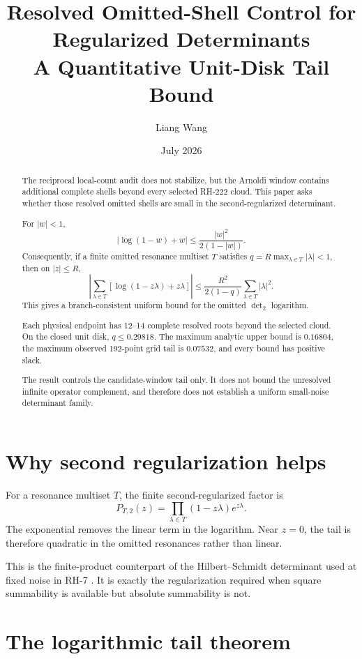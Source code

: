 \documentclass[11pt]{article}
\title{Resolved Omitted-Shell Control for Regularized Determinants\\
\large A Quantitative Unit-Disk Tail Bound}
\author{Liang Wang}
\date{July 2026}
\theoremstyle{remark}\newtheorem{remark}[theorem]{Remark}
\begin{document}
\maketitle

\begin{abstract}
The reciprocal local-count audit does not stabilize, but the Arnoldi window
contains additional complete shells beyond every selected RH-222 cloud. This
paper asks whether those resolved omitted shells are small in the
second-regularized determinant.

For $|w|<1$,
\[
 |\log(1-w)+w|\le\frac{|w|^2}{2(1-|w|)}.
\]
Consequently, if a finite omitted resonance multiset $T$ satisfies
$q=R\max_{\lambda\in T}|\lambda|<1$, then on $|z|\le R$,
\[
 \left|\sum_{\lambda\in T}
 [\log(1-z\lambda)+z\lambda]\right|
 \le \frac{R^2}{2(1-q)}
 \sum_{\lambda\in T}|\lambda|^2.
\]
This gives a branch-consistent uniform bound for the omitted
$\det_2$ logarithm.

Each physical endpoint has 12--14 complete resolved roots beyond the selected
cloud. On the closed unit disk, $q\le0.29818$. The maximum analytic upper
bound is $0.16804$, the maximum observed 192-point grid tail is $0.07532$,
and every bound has positive slack.

The result controls the candidate-window tail only. It does not bound the
unresolved infinite operator complement, and therefore does not establish a
uniform small-noise determinant family.
\end{abstract}

\section{Why second regularization helps}

For a resonance multiset $T$, the finite second-regularized factor is
\begin{equation}\label{eq:factor}
 P_{T,2}(z)=
 \prod_{\lambda\in T}(1-z\lambda)e^{z\lambda}.
\end{equation}
The exponential removes the linear term in the logarithm. Near $z=0$, the
tail is therefore quadratic in the omitted resonances rather than linear.

This is the finite-product counterpart of the Hilbert--Schmidt determinant
used at fixed noise in RH-7 \citep{WangRH7,Simon2005}. It is exactly the
regularization required when square summability is available but absolute
summability is not.

\section{The logarithmic tail theorem}
\end{document}

